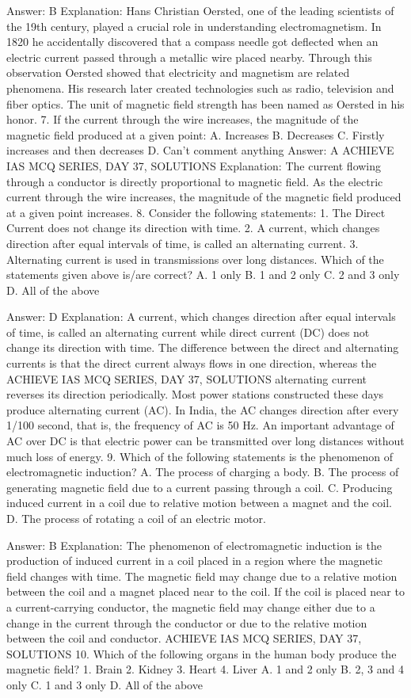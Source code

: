 Answer: B
Explanation: Hans Christian Oersted, one of the leading scientists of the 19th century, played a crucial role in understanding electromagnetism. In 1820 he accidentally discovered that a compass needle got deflected when an electric current passed through a metallic wire placed nearby. Through this observation Oersted showed that electricity and magnetism are related phenomena. His research later created technologies such as radio, television and fiber optics. The unit of magnetic field strength has been named as Oersted in his honor. 7. If the current through the wire increases, the magnitude of the magnetic field produced at a given point: A. Increases B. Decreases C. Firstly increases and then decreases D. Can’t comment anything 
Answer: A ACHIEVE IAS MCQ SERIES, DAY 
37, SOLUTIONS
Explanation: The current flowing through a conductor is directly proportional to magnetic field. As the electric current through the wire increases, the magnitude of the magnetic field produced at a given point increases. 8. Consider the following statements: 1. The Direct Current does not change its direction with time. 2. A current, which changes direction after equal intervals of time, is called an alternating current. 3. Alternating current is used in transmissions over long distances. Which of the statements given above is/are correct? A. 1 only B. 1 and 2 only C. 2 and 3 only D. All of the above 

Answer: D
Explanation: A current, which changes direction after equal intervals of time, is called an alternating current while direct current (DC) does not change its direction with time. The difference between the direct and alternating currents is that the direct current always flows in one direction, whereas the ACHIEVE IAS MCQ SERIES, DAY 37, SOLUTIONS alternating current reverses its direction periodically. Most power stations constructed these days produce alternating current (AC). In India, the AC changes direction after every 1/100 second, that is, the frequency of AC is 50 Hz. An important advantage of AC over DC is that electric power can be transmitted over long distances without much loss of energy. 9. Which of the following statements is the phenomenon of electromagnetic induction? A. The process of charging a body. B. The process of generating magnetic field due to a current passing through a coil. C. Producing induced current in a coil due to relative motion between a magnet and the coil. D. The process of rotating a coil of an electric motor. 

Answer: B
Explanation: The phenomenon of electromagnetic induction is the production of induced current in a coil placed in a region where the magnetic field changes with time. The magnetic field may change due to a relative motion between the coil and a magnet placed near to the coil. If the coil is placed near to a current-carrying conductor, the magnetic field may change either due to a change in the current through the conductor or due to the relative motion between the coil and conductor. ACHIEVE IAS MCQ SERIES, DAY 37, SOLUTIONS 10. Which of the following organs in the human body produce the magnetic field? 1. Brain 2. Kidney 3. Heart 4. Liver A. 1 and 2 only B. 2, 3 and 4 only C. 1 and 3 only D. All of the above 

